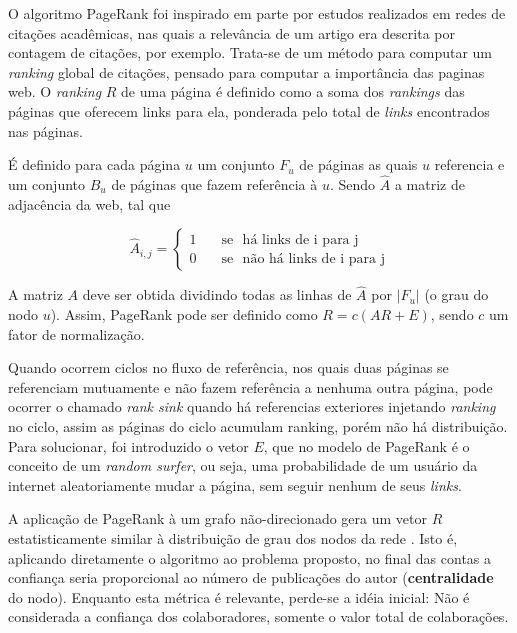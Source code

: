 \documentclass[12pt]{article}
\begin{document}
O algoritmo PageRank \cite{page1999pagerank} foi inspirado em parte por estudos realizados em redes de citações acadêmicas, nas 
quais a relevância de um artigo era descrita por contagem de citações, por exemplo. Trata-se de um método para computar um \textit{ran\-king} 
global de citações, pensado para computar a importância das paginas web. O \textit{ranking} $R$ de uma página é definido como a soma dos 
\textit{rankings} das páginas que oferecem links para ela, ponderada pelo total de \textit{links} encontrados nas páginas.

É definido para cada página $u$ um conjunto $F_u$ de páginas as quais $u$ referencia e um conjunto $B_u$ de páginas que fazem 
referência à $u$. Sendo $\hat{A}$ a matriz de adjacência da web, tal que 

\[ \hat{A}_{i,j} =
  \begin{cases}
    1       & \quad \text{se } \text{ há links de i para j}\\
    0       & \quad \text{se } \text{ não há links de i para j}
  \end{cases}
\]

A matriz $A$ deve ser obtida dividindo todas as linhas de $\hat{A}$ por $|F_u|$ (o grau do nodo $u$). Assim, PageRank pode ser definido 
como $R = c(AR + E)$, sendo $c$ um fator de normalização.

Quando ocorrem ciclos no fluxo de referência, nos quais duas páginas se referenciam mutuamente e não fazem referência a nenhuma 
outra página, pode ocorrer o chamado \textit{rank sink} quando há referencias exteriores injetando \textit{ranking} no ciclo, 
assim as páginas do ciclo acumulam ranking, porém não há distribuição. Para solucionar, foi introduzido o vetor $E$, que no modelo 
de PageRank é o conceito de um \textit{random surfer}, ou seja, uma probabilidade de um usuário da internet aleatoriamente mudar a 
página, sem seguir nenhum de seus \textit{links}. \cite{page1999pagerank}

A aplicação de PageRank à um grafo não-direcionado gera um vetor $R$ estatisticamente similar à distribuição de grau dos nodos da 
rede \cite{perra2008spectral}. Isto é, aplicando diretamente o algoritmo ao problema proposto, no final das contas a confiança 
seria proporcional ao número de publicações do autor (\textbf{centralidade} do nodo). Enquanto esta métrica é relevante, perde-se 
a idéia inicial: Não é considerada a confiança dos colaboradores, somente o valor total de colaborações. 
\end{document}
